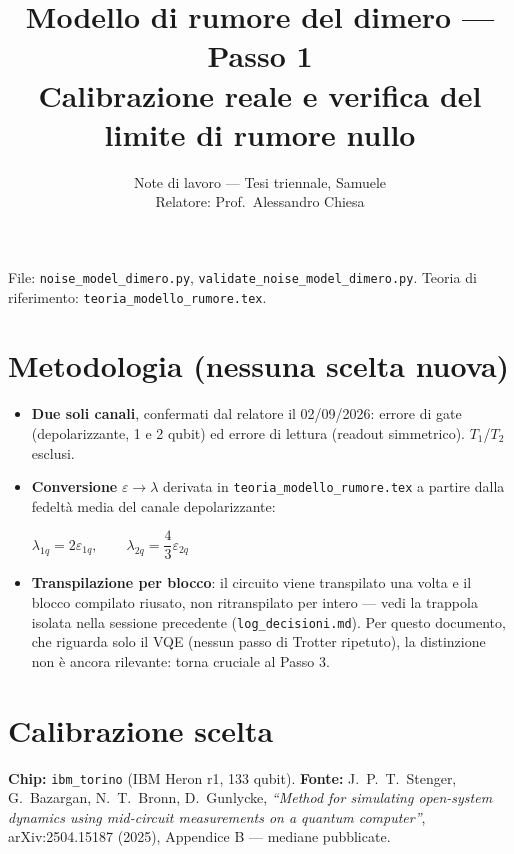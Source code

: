 \documentclass[11pt,a4paper]{article}
\title{\vspace{-1.5em}\color{inkblue}Modello di rumore del dimero --- Passo 1\\[0.2em]
\Large\normalfont\color{softgray}Calibrazione reale e verifica del limite di rumore nullo}
\author{Note di lavoro --- Tesi triennale, Samuele\\ Relatore: Prof.\ Alessandro Chiesa}
\date{}
\begin{document}
\sloppy
\maketitle
\thispagestyle{fancy}
\vspace{-2.2em}

File: \texttt{noise\_model\_dimero.py}, \texttt{validate\_noise\_model\_dimero.py}.
Teoria di riferimento: \texttt{teoria\_modello\_rumore.tex}.

\section*{Metodologia (nessuna scelta nuova)}

\begin{itemize}[leftmargin=1.3em,itemsep=0.25em]
\item \textbf{Due soli canali}, confermati dal relatore il 02/09/2026: errore
di gate (depolarizzante, 1 e 2 qubit) ed errore di lettura (readout
simmetrico). $T_1$/$T_2$ esclusi.
\item \textbf{Conversione} $\varepsilon\to\lambda$ derivata in
\texttt{teoria\_modello\_rumore.tex} a partire dalla fedeltà media del
canale depolarizzante:
\begin{keyeq}
\centering
$\lambda_{1q}=2\varepsilon_{1q}, \qquad \lambda_{2q}=\dfrac43\varepsilon_{2q}$
\end{keyeq}
\item \textbf{Transpilazione per blocco}: il circuito viene transpilato una
volta e il blocco compilato riusato, non ritranspilato per intero --- vedi
la trappola isolata nella sessione precedente (\texttt{log\_decisioni.md}).
Per questo documento, che riguarda solo il VQE (nessun passo di Trotter
ripetuto), la distinzione non è ancora rilevante: torna cruciale al Passo 3.
\end{itemize}

\section*{Calibrazione scelta}

\textbf{Chip:} \texttt{ibm\_torino} (IBM Heron r1, 133 qubit). \textbf{Fonte:}
J.~P.~T.~Stenger, G.~Bazargan, N.~T.~Bronn, D.~Gunlycke, \emph{“Method for
simulating open-system dynamics using mid-circuit measurements on a quantum
computer”}, arXiv:2504.15187 (2025), Appendice B --- mediane pubblicate.
\end{document}
